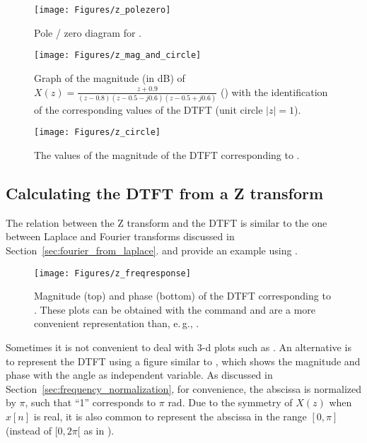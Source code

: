 \begin{figure}[!htb]
        \centering
                \texttt{[image: Figures/z\_polezero]}          
        \caption{Pole / zero diagram for .\label{fig:z_polezero}}
\end{figure}

\begin{figure}[!htb]
        \centering
                \texttt{[image: Figures/z\_mag\_and\_circle]}            
        \caption{Graph of the magnitude (in dB) of $X(z) = \frac{z+0.9}{(z-0.8)(z-0.5-j0.6)(z-0.5+j0.6)}$ () with the identification of the corresponding values of the DTFT (unit circle $|z|=1$).\label{fig:z_mag_and_circle}}
\end{figure}

\begin{figure}[!htb]
        \centering
                \texttt{[image: Figures/z\_circle]}            
        \caption{The values of the magnitude of the DTFT corresponding to .\label{fig:z_circle}}
\end{figure}

\subsection{Calculating the DTFT from a Z transform}

The relation between the Z transform and the DTFT is similar to the one between Laplace and Fourier transforms discussed
in Section~\ref{sec:fourier_from_laplace}.
 and
 provide an example using .

\begin{figure}[!htb]
        \centering
                \texttt{[image: Figures/z\_freqresponse]}              
        \caption{Magnitude (top) and phase (bottom) of the DTFT corresponding to . These plots can be obtained with the {\matlab} command  and are a more convenient representation than, e.\,g., .\label{fig:z_freqresponse}}
\end{figure}

Sometimes it is not convenient to deal with 3-d plots such as . An alternative is to represent the DTFT using a figure similar to , which shows the magnitude and phase with the angle as independent variable. As discussed in Section~\ref{sec:frequency_normalization}, for convenience, the abscissa is normalized by $\pi$, such that ``1'' corresponds to $\pi$ rad. Due to the symmetry of $X(z)$ when $x[n]$ is real, it is also common to represent the abscissa in the range $[0, \pi]$ (instead of $[0,2\pi[$ as in ).


